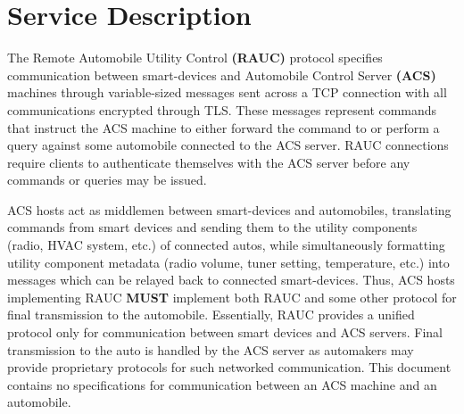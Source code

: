 \documentclass{article}
\begin{document}
\section{Service Description}
\label{sec:serv_desc}

The Remote Automobile Utility Control \textbf{(RAUC)} protocol specifies communication between smart-devices and Automobile Control Server \textbf{(ACS)} machines through variable-sized messages sent across a TCP connection with all communications encrypted through TLS. These messages represent commands that instruct the ACS machine to either forward the command to or perform a query against some automobile connected to the ACS server. RAUC connections require clients to authenticate themselves with the ACS server before any commands or queries may be issued.
\par
ACS hosts act as middlemen between smart-devices and automobiles, translating commands from smart devices and sending them to the utility components (radio, HVAC system, etc.) of connected autos, while simultaneously formatting utility component metadata (radio volume, tuner setting, temperature, etc.) into messages which can be relayed back to connected smart-devices. Thus, ACS hosts implementing RAUC \textbf{MUST} implement both RAUC and some other protocol for final transmission to the automobile. Essentially, RAUC provides a unified protocol only for communication between smart devices and ACS servers. Final transmission to the auto is handled by the ACS server as automakers may provide proprietary protocols for such networked communication. This document contains no specifications for communication between an ACS machine and an automobile.
\end{document}
